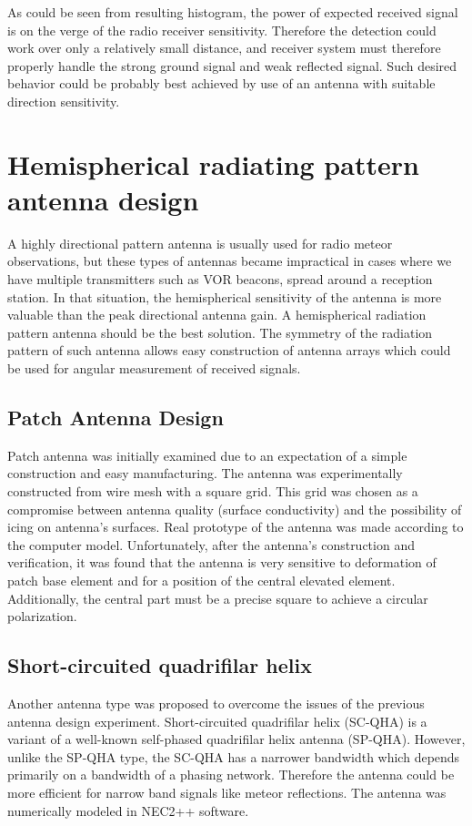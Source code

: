 \documentclass[twoside]{ctuthesis}
\theoremstyle{plain}
\theoremstyle{definition}
\theoremstyle{note}
\begin{document}
As could be seen from resulting histogram, the power of expected received signal is on the verge of the radio receiver sensitivity. Therefore the detection could work over only a relatively small distance, and receiver system must therefore properly handle the strong ground signal and weak reflected signal. Such desired behavior could be probably best achieved by use of an antenna with suitable direction sensitivity.

\section{Hemispherical radiating pattern antenna design}

A highly directional pattern antenna is usually used for radio meteor observations, but these types of antennas became impractical in cases where we have multiple transmitters such as VOR beacons, spread around a reception station. In that situation, the hemispherical sensitivity of the antenna is more valuable than the peak directional antenna gain. A hemispherical radiation pattern antenna should be the best solution.  The symmetry of the radiation pattern of such antenna allows easy construction of antenna arrays which could be used for angular measurement of received signals.

\subsection{Patch Antenna Design }

Patch antenna was initially examined due to an expectation of a simple construction and easy manufacturing. The antenna was experimentally constructed from wire mesh with a square grid. This grid was chosen as a compromise between antenna quality (surface conductivity)  and the possibility of icing on antenna’s surfaces. Real prototype of the antenna was made according to the computer model. Unfortunately, after the antenna’s construction and verification, it was found that the antenna is very sensitive to deformation of patch base element and for a position of the central elevated element. Additionally, the central part must be a precise square to achieve a circular polarization. 

\subsection{Short-circuited quadrifilar helix}

Another antenna type was proposed to overcome the issues of the previous antenna design experiment.  Short-circuited quadrifilar helix (SC-QHA) is a variant of a well-known self-phased quadrifilar helix antenna (SP-QHA). However, unlike the SP-QHA type, the  SC-QHA has a narrower bandwidth which depends primarily on a bandwidth of a phasing network. Therefore the antenna could be more efficient for narrow band signals like meteor reflections.  The antenna was numerically modeled in NEC2++ software.
\end{document}
